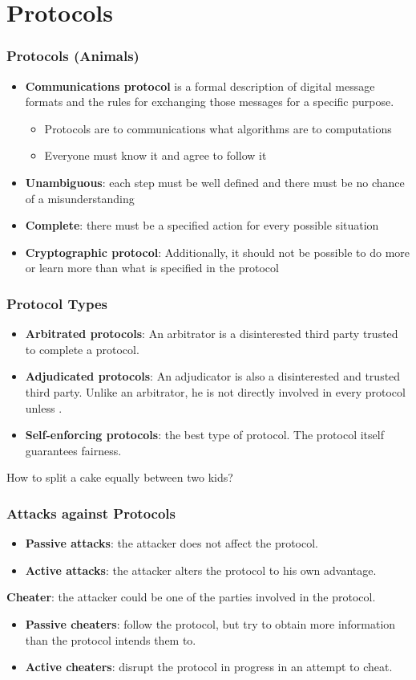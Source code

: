 \section{Protocols}
\begin{frame}\frametitle{Protocols (Animals)}
\begin{itemize}
\item \textbf{Communications protocol} is a formal description of digital message formats and the rules for exchanging those messages for a specific purpose.
\begin{itemize}
\item Protocols are to communications what algorithms are to computations
\item Everyone must know it and agree to follow it
\end{itemize}
\item \textbf{Unambiguous}: each step must be well defined and there must be no chance of a misunderstanding
\item \textbf{Complete}: there must be a specified action for every possible situation
\item \textbf{Cryptographic protocol}: Additionally, it should not be possible to do more or learn more than what is specified in the protocol
\end{itemize}
\end{frame}
\begin{frame}\frametitle{Protocol Types}
\begin{itemize}
\item \textbf{Arbitrated protocols}: An arbitrator is a disinterested third party trusted to complete a protocol.
\item \textbf{Adjudicated protocols}: An adjudicator is also a disinterested and trusted third party. Unlike an arbitrator, he is not directly involved in every protocol unless .
\item \textbf{Self-enforcing protocols}: the best type of protocol. The protocol itself guarantees fairness.
\end{itemize}
\begin{exampleblock}{How to split a cake equally between two kids?}\end{exampleblock}
\end{frame}
\begin{frame}\frametitle{Attacks against Protocols}
\begin{itemize}
\item \textbf{Passive attacks}: the attacker does not affect the protocol.
\item \textbf{Active attacks}: the attacker alters the protocol to his own advantage.
\end{itemize}
\textbf{Cheater}: the attacker could be one of the parties involved in the protocol.
\begin{itemize}
\item \textbf{Passive cheaters}: follow the protocol, but try to obtain more information than the protocol intends them to.
\item \textbf{Active cheaters}: disrupt the protocol in progress in an attempt to cheat.
\end{itemize}
\end{frame}

